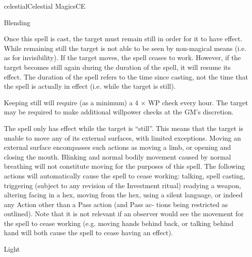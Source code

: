 \begin{College}[1.3]{celestial}{Celestial Magics}{CE}
\begin{spell}[G-1]{Blending}
\begin{effects}
Once this spell is cast, the target must remain still in order for it
to have effect.  While remaining still the target is not able to be
seen by non-magical means (i.e.  as for invisibility).  If the target
moves, the spell ceases to work. However, if the target becomes still
again during the duration of the spell, it will resume its effect.
The duration of the spell refers to the time since casting, not the
time that the spell is actually in effect (i.e.  while the target is
still).

Keeping still will require (as a minimum) a 4 × WP check every hour.
The target may be required to make additional willpower checks at the
GM’s discretion.

The spell only has effect while the target is “still”.  This means
that the target is unable to move any of its external surfaces, with
limited exceptions. Moving an external surface encompasses such
actions as moving a limb, or opening and closing the mouth.  Blinking
and normal bodily movement caused by normal breathing will not
constitute moving for the purposes of this spell.  The following
actions will automatically cause the spell to cease working: talking,
spell casting, triggering (subject to any revision of the Investment
ritual) readying a weapon, altering facing in a hex, moving from the
hex, using a silent language, or indeed any Action other than a Pass
action (and Pass ac- tions being restricted as outlined).  Note that
it is not relevant if an observer would see the movement for the spell
to cease working (e.g.  moving hands behind back, or talking behind
hand will both cause the spell to cease having an effect).
\end{effects}
\end{spell}

\begin{spell}[G-2]{Light}


\end{spell}
\end{College}
